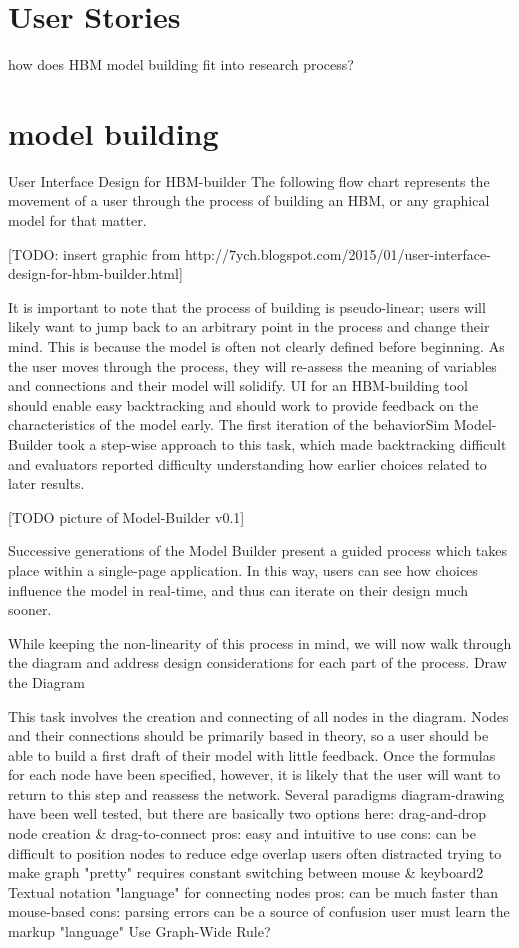 \section{User Stories}
how does HBM model building fit into research process?

\section{model building}
User Interface Design for HBM-builder 
The following flow chart represents the movement of a user through the process of building an HBM, or any graphical model for that matter.

[TODO: insert graphic from http://7ych.blogspot.com/2015/01/user-interface-design-for-hbm-builder.html]

It is important to note that the process of building is pseudo-linear; users will likely want to jump back to an arbitrary point in the process and change their mind. This is because the model is often not clearly defined before beginning. As the user moves through the process, they will re-assess the meaning of variables and connections and their model will solidify. UI for an HBM-building tool should enable easy backtracking and should work to provide feedback on the characteristics of the model early. The first iteration of the behaviorSim Model-Builder took a step-wise approach to this task, which made backtracking difficult and evaluators reported difficulty understanding how earlier choices related to later results.

[TODO picture of Model-Builder v0.1] 

Successive generations of the Model Builder present a guided process which takes place within  a single-page application. In this way, users can see how choices influence the model in real-time, and thus can iterate on their design much sooner.

While keeping the non-linearity of this process in mind, we will now walk through the diagram and address design considerations for each part of the process.
Draw the Diagram

This task involves the creation and connecting of all nodes in the diagram. Nodes and their connections should be primarily based in theory, so a user should be able to build a first draft of their model with little feedback. Once the formulas for each node have been specified, however, it is likely that the user will want to return to this step and reassess the network. Several paradigms diagram-drawing have been well tested, but there are basically two options here:
drag-and-drop node creation & drag-to-connect
pros:
easy and intuitive to use
cons: 
can be difficult to position nodes to reduce edge overlap
users often distracted trying to make graph "pretty"
requires constant switching between mouse & keyboard2
Textual notation "language" for connecting nodes
pros:
can be much faster than mouse-based
cons:
parsing errors can be a source of confusion
user must learn the markup "language"
Use Graph-Wide Rule?

